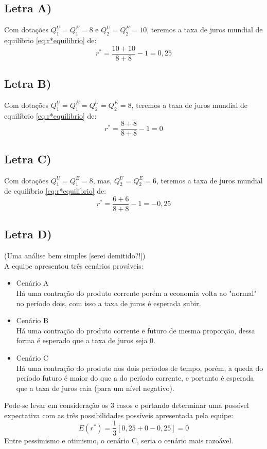 \documentclass{article}
\begin{document}
\subsection*{Letra A)}
Com dotações $Q_1^{U}=Q_1^{E}=8$ e $Q_2^U=Q_2^E=10$, teremos a taxa de juros mundial de equilíbrio \eqref{eq:r*equilibrio} de:
\begin{equation}
    r^*=\frac{10+10}{8 + 8}-1 = 0,25
\end{equation}
\subsection*{Letra B)}
Com dotações $Q_1^{U}=Q_1^{E}=Q_2^U=Q_2^E=8$, teremos a taxa de juros mundial de equilíbrio \eqref{eq:r*equilibrio} de:
\begin{equation}
    r^*=\frac{8+8}{8 + 8}-1 = 0
\end{equation}
\subsection*{Letra C)}
Com dotações $Q_1^{U}=Q_1^{E}=8$, mas, $Q_2^U=Q_2^E=6$, teremos a taxa de juros mundial de equilíbrio \eqref{eq:r*equilibrio} de:
\begin{equation}
    r^*=\frac{6+6}{8 + 8}-1 = -0,25
\end{equation}
\subsection*{Letra D)}
(Uma análise bem simples [serei demitido?!])\\
A equipe apresentou três cenários prováveis:
\begin{itemize}
    \item Cenário A\\
    Há uma contração do produto corrente porém a economia volta ao "normal" no período dois, com isso a taxa de juros é esperada subir.
    \item Cenário B\\
    Há uma contração do produto corrente e futuro de mesma proporção, dessa forma é esperado que a taxa de juros seja 0.
    \item Cenário C\\
    Há uma contração do produto nos dois períodos de tempo, porém, a queda do período futuro é maior do que a do período corrente, e portanto é esperada que a taxa de juros caia (para um nível negativo).
\end{itemize}
Pode-se levar em consideração os 3 casos e portando determinar uma possível expectativa com as três possibilidades possíveis apresentada pela equipe:
\begin{equation}
    E(r^*)=\frac{1}{3}\left[0,25+0-0,25\right]=0
\end{equation}
Entre pessimismo e otimismo, o cenário C, seria o cenário mais razoável.
\end{document}
